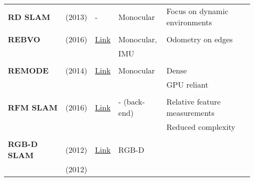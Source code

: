 \documentclass[a4paper,12pt]{scrartcl}
\begin{document}
{\begin{longtable}{l|l|l|l|l}
    \textbf{RD SLAM}       & \cite{Tan2013a} (2013)            & -                                                                  & Monocular             & Focus on dynamic environments\\
                           &                                   &                                                                    &                       &\\
    \textbf{REBVO}         & \cite{Tarrio2016} (2016)          & {\href{https://github.com/JuanTarrio/rebvo}{Link}}                 & Monocular,            & Odometry on edges\\
                           &                                   &                                                                    & IMU                   &\\
                           &                                   &                                                                    &                       &\\
    \textbf{REMODE}        & \cite{Pizzoli2014} (2014)         & {\href{https://github.com/uzh-rpg/rpg_open_remode}{Link}}          & Monocular             & Dense\\
                           &                                   &                                                                    &                       & GPU reliant\\
                           &                                   &                                                                    &                       &\\
    \textbf{RFM SLAM}      & \cite{Agarwal2016} (2016)         & {\href{https://github.com/sauravag/edpl-rfmslam}{Link}}            & - (back-end)          & Relative feature measurements\\
                           &                                   &                                                                    &                       & Reduced complexity\\
                           &                                   &                                                                    &                       &\\
    \textbf{RGB-D SLAM}    & \cite{Endres2012} (2012)          & {\href{https://github.com/felixendres/rgbdslam_v2}{Link}}          & RGB-D                 &\\
                           & \cite{Endres2012a} (2012)         &                                                                    &                       &\\

\end{longtable}}
\end{document}
